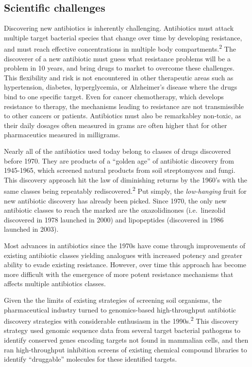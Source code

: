 \documentclass[
]{book}
\begin{document}
\hypertarget{scientific-challenges}{%
\subsection*{Scientific challenges}\label{scientific-challenges}}

Discovering new antibiotics is inherently challenging. Antibiotics must attack multiple target bacterial species that change over time by developing resistance, and must reach effective concentrations in multiple body compartments.\textsuperscript{2} The discoverer of a new antibiotic must guess what resistance problems will be a problem in 10 years, and bring drugs to market to overcome these challenges. This flexibility and risk is not encountered in other therapeutic areas such as hypertension, diabetes, hyperglycemia, or Alzheimer's disease where the drugs bind to one specific target. Even for cancer chemotherapy, which develops resistance to therapy, the mechanisms leading to resistance are not transmissible to other cancers or patients. Antibiotics must also be remarkabley non-toxic, as their daily dosages often measured in grams are often higher that for other pharmaceutics measured in milligrams.

Nearly all of the antibiotics used today belong to classes of drugs discovered before 1970. They are products of a ``golden age'' of antibiotic discovery from 1945-1965, which screened natural products from soil streptomyces and fungi. This discovery approach hit the law of diminishing returns by the 1960's with the same classes being repeatably rediscovered.\textsuperscript{2} Put simply, the \emph{low-hanging} fruit for new antibiotic discovery has already been picked. Since 1970, the only new antibiotic classes to reach the marked are the oxazolidinones (i.e.~linezolid discovered in 1978 launched in 2000) and lipopeptides (discovered in 1986 launched in 2003).

Most advances in antibiotics since the 1970s have come through improvements of existing antibiotic classes yielding analogues with increased potency and greater ability to evade existing resistance. However, over time this approach has become more difficult with the emergence of more potent resistance mechanisms that affects multiple antibiotics classes.

Given the the limits of existing strategies of screening soil organisms, the pharmaceutical industry turned to genomics-based high-throughput antibiotic discovery strategies with considerable enthusiasm in the 1990s.\textsuperscript{2} This discovery strategy used genomic sequence data from several target bacterial pathogens to identify conserved genes encoding targets not found in mammalian cells, and then ran high-throughput inhibition screens of existing chemical compound libraries to identify ``druggable'' molecules for these identified targets.
\end{document}
